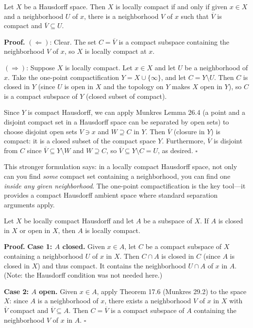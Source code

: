 \documentclass[11pt]{report}
\renewenvironment{proof}[1][Proof]{\noindent\textbf{#1.} }{\hfill$\square$\par\vspace{5pt}}
\begin{document}
\begin{thmbox}
Let $X$ be a Hausdorff space. Then $X$ is locally compact if and only if given $x \in X$ and a neighborhood $U$ of $x$, there is a neighborhood $V$ of $x$ such that $\overline{V}$ is compact and $\overline{V} \subseteq U$.
\end{thmbox}

\begin{proof}
$(\Leftarrow)$: Clear. The set $C = \overline{V}$ is a compact subspace containing the neighborhood $V$ of $x$, so $X$ is locally compact at $x$.

$(\Rightarrow)$: Suppose $X$ is locally compact. Let $x \in X$ and let $U$ be a neighborhood of $x$. Take the one-point compactification $Y = X \cup \{\infty\}$, and let $C = Y \setminus U$. Then $C$ is closed in $Y$ (since $U$ is open in $X$ and the topology on $Y$ makes $X$ open in $Y$), so $C$ is a compact subspace of $Y$ (closed subset of compact).

Since $Y$ is compact Hausdorff, we can apply Munkres Lemma 26.4 (a point and a disjoint compact set in a Hausdorff space can be separated by open sets) to choose disjoint open sets $V \ni x$ and $W \supseteq C$ in $Y$. Then $\overline{V}$ (closure in $Y$) is compact: it is a closed subset of the compact space $Y$. Furthermore, $\overline{V}$ is disjoint from $C$ since $\overline{V} \subseteq Y \setminus W$ and $W \supseteq C$, so $\overline{V} \subseteq Y \setminus C = U$, as desired.
\end{proof}

\begin{rembox}
This stronger formulation says: in a locally compact Hausdorff space, not only can you find \emph{some} compact set containing a neighborhood, you can find one \emph{inside any given neighborhood}. The one-point compactification is the key tool---it provides a compact Hausdorff ambient space where standard separation arguments apply.
\end{rembox}

\begin{corbox}
Let $X$ be locally compact Hausdorff and let $A$ be a subspace of $X$. If $A$ is closed in $X$ or open in $X$, then $A$ is locally compact.
\end{corbox}

\begin{proof}
\textbf{Case 1: $A$ closed.} Given $x \in A$, let $C$ be a compact subspace of $X$ containing a neighborhood $U$ of $x$ in $X$. Then $C \cap A$ is closed in $C$ (since $A$ is closed in $X$) and thus compact. It contains the neighborhood $U \cap A$ of $x$ in $A$. (Note: the Hausdorff condition was not needed here.)

\textbf{Case 2: $A$ open.} Given $x \in A$, apply Theorem 17.6 (Munkres 29.2) to the space $X$: since $A$ is a neighborhood of $x$, there exists a neighborhood $V$ of $x$ in $X$ with $\overline{V}$ compact and $\overline{V} \subseteq A$. Then $C = \overline{V}$ is a compact subspace of $A$ containing the neighborhood $V$ of $x$ in $A$.
\end{proof}
\end{document}
